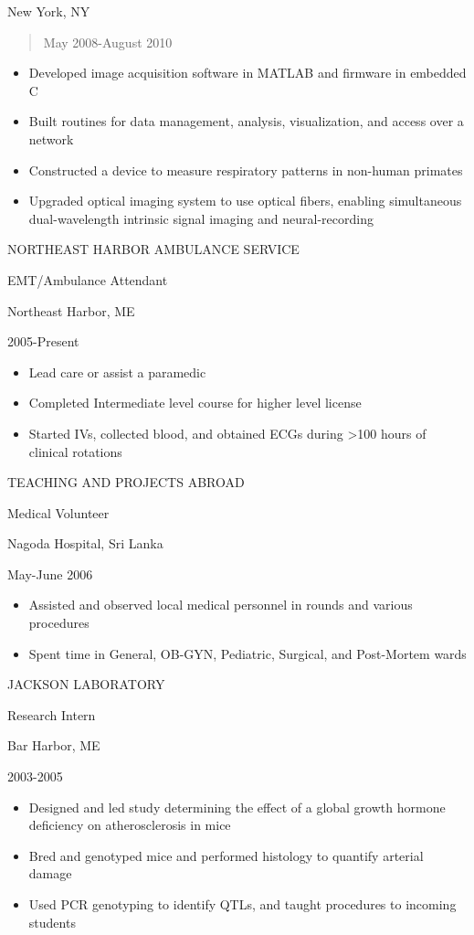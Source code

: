 New York, NY

\begin{quote}
May 2008-August 2010
\end{quote}

\begin{itemize}
\item
  Developed image acquisition software in MATLAB and firmware in
  embedded C
\item
  Built routines for data management, analysis, visualization, and
  access over a network
\item
  Constructed a device to measure respiratory patterns in non-human
  primates
\item
  Upgraded optical imaging system to use optical fibers, enabling
  simultaneous dual-wavelength intrinsic signal imaging and
  neural-recording
\end{itemize}

NORTHEAST HARBOR AMBULANCE SERVICE

EMT/Ambulance Attendant

Northeast Harbor, ME

2005-Present

\begin{itemize}
\item
  Lead care or assist a paramedic
\item
  Completed Intermediate level course for higher level license
\item
  Started IVs, collected blood, and obtained ECGs during \textgreater100
  hours of clinical rotations
\end{itemize}

TEACHING AND PROJECTS ABROAD

Medical Volunteer

Nagoda Hospital, Sri Lanka

May-June 2006

\begin{itemize}
\item
  Assisted and observed local medical personnel in rounds and various
  procedures
\item
  Spent time in General, OB-GYN, Pediatric, Surgical, and Post-Mortem
  wards
\end{itemize}

JACKSON LABORATORY

Research Intern

Bar Harbor, ME

2003-2005

\begin{itemize}
\item
  Designed and led study determining the effect of a global growth
  hormone deficiency on atherosclerosis in mice
\item
  Bred and genotyped mice and performed histology to quantify arterial
  damage
\item
  Used PCR genotyping to identify QTLs, and taught procedures to
  incoming students
\end{itemize}

